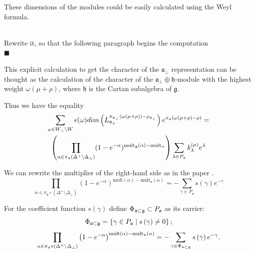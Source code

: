 \documentclass[a4paper,12pt]{article}
\theoremstyle{definition} \newtheorem{Def}{Definition}
\newenvironment{comment}
{\par\noindent{\bf TODO}\\}
{\\\hfill$\scriptstyle\blacksquare$\par}
\begin{document}
These dimensions of the modules could be easily calculated using the Weyl formula.
\begin{comment}
  Rewrite it, so that the following paragraph begins the computation
\end{comment}
This explicit calculation to get the character of the $\mathfrak{a}_{\bot}$ representation can be thought as the calculation of the character of the $\mathfrak{a}_{\bot}\oplus \mathfrak{h}$-module with the highest weight $\omega(\mu+\rho)$, where $\mathfrak{h}$ is the Cartan subalgebra of $\mathfrak{g}$.

Thus we have the equality
\begin{multline}
  \label{eq:9}
  \sum_{\omega\in W_{\bot}\backslash W} \epsilon(\omega) dim\left(L^{\pi_{\mathfrak{a}_{\bot}}(\omega(\mu+\rho))-\rho_{\mathfrak{a}_{\bot}}}_{\mathfrak{a}_{\bot}}\right) e^{\pi_{\mathfrak{a}}(\omega(\mu+\rho)-\rho)}=\\
  \left(\prod_{\alpha\in \pi_{\mathfrak{a}}\left(\Delta^{+}\setminus \Delta_{\bot}\right)}(1-e^{-\alpha})^{{\rm mult}_{\mathfrak{g}}(\alpha)-{\rm mult}_{\mathfrak{\alpha}}} \right)
  \sum_{\lambda \in P_{\frak{a}}}k_{\lambda}^{\left( \mu \right) }e^{\lambda } 
\end{multline}

We can rewrite the multiplier of the right-hand side as in the paper \cite{ilyin812pbc}.
\begin{equation}
  \label{eq:11}
    \prod_{\alpha\in \pi_{\mathfrak{a}}\circ (\Delta^{+}\setminus \Delta_{\bot})} \left(1-e^{-\alpha}\right)^{\mathrm{mult}(\alpha)-\mathrm{mult}_{\mathfrak{a}}(\alpha)}=
     -\sum_{\gamma\in P_{\mathfrak{a}}} s(\gamma)e^{-\gamma}
\end{equation}

For the coefficient function $s\left( \gamma \right) $ define $\Phi _{\frak{a%
}\subset \frak{g}}\subset P_{\frak{a}}$ as its carrier: 
\begin{equation}
\Phi _{\frak{a}\subset \frak{g}}=\left\{ \gamma \in P_{\frak{a}}\mid s\left(
\gamma \right) \neq 0\right\} ;  \label{phi-d}
\end{equation}
\begin{equation}
\prod_{\alpha\in \pi_{\mathfrak{a}}\circ (\Delta^{+}\setminus \Delta_{\bot})}\left(1-e^{-\alpha }\right) ^{\mathrm{{mult}\left( \alpha \right) -{mult}_{\frak{a}}}\mathrm{\left( \alpha \right) }}=-\sum_{\gamma \in \Phi _{\frak{a}\subset 
\frak{g}}}s\left( \gamma \right) e^{-\gamma }.  \label{fan-d}
\end{equation}
\end{document}
